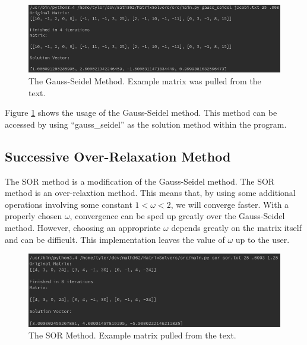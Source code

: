 \documentclass[12pt]{article}
\begin{document}
 
\begin{figure}[H]
\begin{center}
\includegraphics[scale=.5]{gauss_seidel.png}
\caption{The Gauss-Seidel Method. Example matrix was pulled from the text\cite{numerical}.}
\label{gauss_seidel}
\end{center}
\end{figure}

Figure \ref{gauss_seidel} shows the usage of the Gauss-Seidel method. This method can be accessed by using ``gauss\_seidel''
as the solution method within the program.

\subsection{Successive Over-Relaxation Method}

The SOR method is a modification of the Gauss-Seidel method\cite{numerical}. The SOR method is 
an over-relaxtion method\cite{numerical}. This means that, by using some additional operations 
involving some constant $1 < \omega < 2$, we will converge faster\cite{numerical}. With a 
properly chosen $\omega$, convergence can be sped up greatly over the Gauss-Seidel
method\cite{numerical}. However, choosing an appropriate $\omega$ depends greatly on the matrix
itself and can be difficult\cite{numerical}. This implementation leaves the value of 
$\omega$ up to the user.

\begin{figure}[H]
\begin{center}
\includegraphics[scale=.5]{sor.png}
\caption{The SOR Method. Example matrix pulled from the text\cite{numerical}.}
\label{sor}
\end{center}
\end{figure}
\end{document}
